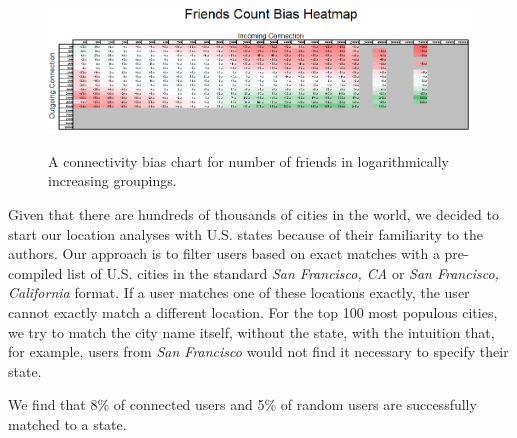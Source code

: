 \begin{figure}[t]
 \centering
 \includegraphics[bb=0 0 746 221,scale=.55]{./images/friends_count.png}
 \label{fig:friend_count}
 \caption{A connectivity bias chart for number of friends in logarithmically increasing groupings.}
\end{figure}


Given that there are hundreds of thousands of cities in the world, we decided to start our location analyses with U.S. states because of their familiarity to the authors.  Our approach is to filter users based on exact matches with a pre-compiled list of U.S. cities in the standard \textit{San Francisco, CA} or \textit{San Francisco, California} format.  If a user matches one of these locations exactly, the user cannot exactly match a different location.  For the top 100 most populous cities, we try to match the city name itself, without the state, with the intuition that, for example, users from \textit{San Francisco} would not find it necessary to specify their state.

We find that 8\% of connected users and 5\% of random users are successfully matched to a state.
